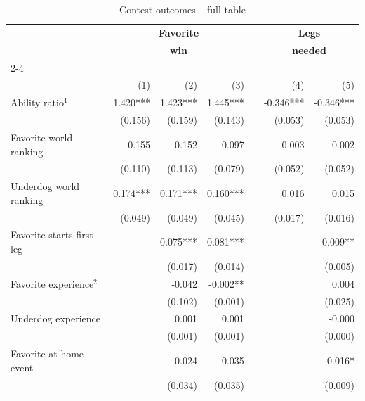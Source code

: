 \documentclass[11pt,a4paper]{article}
\begin{document}
	\begin{table}[H]
		\centering
		\caption{Contest outcomes -- full table} 
		\label{tab:table_app_contest}
		\begin{tabular}{l r r r r r r} 
			\toprule \toprule
			& \multicolumn{3}{c}{\textbf{~~~~Favorite~~~~}} & & \multicolumn{2}{c}{\textbf{~~~~~~Legs~~~~~~}} \\
			& \multicolumn{3}{c}{\textbf{~~~~win~~~~}} & & \multicolumn{2}{c}{\textbf{needed}} \\
            \cline{2-4} \cline{6-7}  \vspace{0.01em}\\ 
			\textbf{}                   & (1)      &  (2)    &  (3)   & &  (4)   &  (5)    \\ 
			\midrule
			Ability ratio$^1$          &   1.420***  & 1.423***  & 1.445***  & & -0.346*** &   -0.346*** \\
			                           &   (0.156)   & (0.159)   & (0.143)   & & (0.053)   &  (0.053)    \\
			Favorite world ranking     &    0.155    & 0.152     & -0.097    & & -0.003    &   -0.002    \\
			                           &   (0.110)   & (0.113)   & (0.079)   & & (0.052)   &  (0.052)    \\
			Underdog world ranking     &    0.174*** & 0.171***  & 0.160***  & & 0.016     &   0.015     \\
			                           &   (0.049)   & (0.049)   & (0.045)   & & (0.017)   &  (0.016)    \\
			Favorite starts first leg  &             & 0.075***  & 0.081***  & &           & -0.009**    \\
			                           &             & (0.017)   & (0.014)   & &           &  (0.005)    \\
			Favorite experience$^{2}$  &             & -0.042    & -0.002**  & &           &  0.004      \\
			                           &             & (0.102)   & (0.001)   & &           &  (0.025)    \\
			Underdog experience        &             & 0.001     & 0.001     & &           &  -0.000     \\
			                           &             & (0.001)   & (0.001)   & &           &  (0.000)    \\
			Favorite at home event     &             & 0.024     & 0.035     & &           &  0.016*     \\
			                           &             & (0.034)   & (0.035)   & &           &  (0.009)    \\

\end{tabular}
\end{table}
\end{document}
